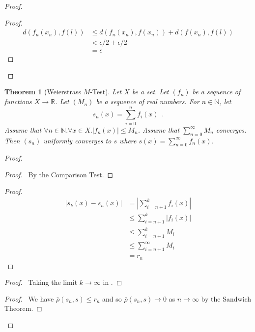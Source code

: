 \documentclass{book}
\let\qed\relax
\newtheorem{thm}[ax]{Theorem}
\theoremstyle{definition}
\begin{document}
\begin{proof}
\pf
{}
\begin{proof}
	\pf
	\begin{align*}
		d(f_n(x_n),f(l)) & \leq d(f_n(x_n),f(x_n)) + d(f(x_n),f(l)) \\
		& < \epsilon / 2 + \epsilon / 2 \\
		& = \epsilon
	\end{align*}
\end{proof}
\qed
\end{proof}

\begin{thm}[Weierstrass $M$-Test]
Let $X$ be a set. Let $(f_n)$ be a sequence of functions $X \rightarrow \mathbb{R}$. Let $(M_n)$ be a sequence of real numbers. For $n \in \mathbb{N}$, let
\[ s_n(x) = \sum_{i=0}^n f_i(x) \enspace . \]
Assume that $\forall n \in \mathbb{N}. \forall x \in X. |f_n(x)| \leq M_n$. Assume that $\sum_{n=0}^\infty M_n$ converges. Then $(s_n)$ uniformly converges to $s$ where $s(x) = \sum_{n=0}^\infty f_n(x)$.
\end{thm}

\begin{proof}
\pf
{}
\begin{proof}
	\pf\ By the Comparison Test.
\end{proof}
\begin{proof}
	\pf
	\begin{align*}
		|s_k(x) - s_n(x)| & = \left| \sum_{i=n+1}^k f_i(x) \right| \\
		& \leq \sum_{i=n+1}^k |f_i(x)| \\
		& \leq \sum_{i=n+1}^k M_i \\
		& \leq \sum_{i=n+1}^\infty M_i \\
		& = r_n
	\end{align*}
\end{proof}
\begin{proof}
	\pf\ Taking the limit $k \rightarrow \infty$ in .
\end{proof}
\begin{proof}
	\pf\ We have $\overline{\rho}(s_n,s) \leq r_n$ and so $\overline{\rho}(s_n,s) \rightarrow 0$ as $n \rightarrow \infty$ by the Sandwich Theorem.
\end{proof}
\qed
\end{proof}
\end{document}
